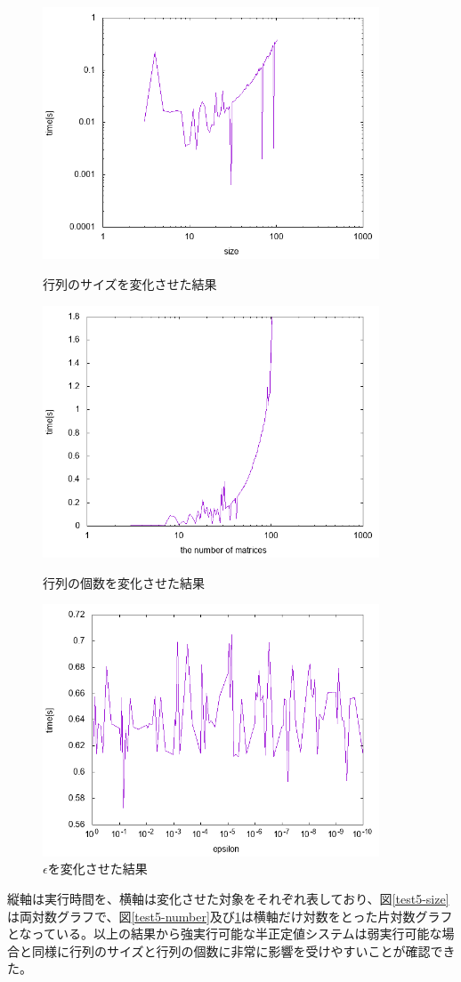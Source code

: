 \begin{figure}
  \centering
  \includegraphics[width=10cm]{strongly_feasible/size.png}
  \caption{行列のサイズを変化させた結果}
  \label{test5-size}
  \includegraphics[width=10cm]{strongly_feasible/number.png}
  \caption{行列の個数を変化させた結果}
  \label{test5-number}
  \includegraphics[width=10cm]{strongly_feasible/epsilon.png}
  \caption{$\epsilon$を変化させた結果}
  \label{test5-epsilon}
\end{figure}
縦軸は実行時間を、横軸は変化させた対象をそれぞれ表しており、図\ref{test5-size}は両対数グラフで、図\ref{test5-number}及び\ref{test5-epsilon}は横軸だけ対数をとった片対数グラフとなっている。以上の結果から強実行可能な半正定値システムは弱実行可能な場合と同様に行列のサイズと行列の個数に非常に影響を受けやすいことが確認できた。
